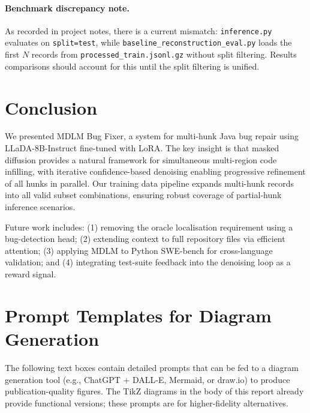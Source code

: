 \documentclass[11pt,a4paper]{article}
\begin{document}
\paragraph{Benchmark discrepancy note.}
As recorded in project notes, there is a current mismatch: \texttt{inference.py} evaluates on \texttt{split=test}, while \texttt{baseline\_reconstruction\_eval.py} loads the first $N$ records from \texttt{processed\_train.jsonl.gz} without split filtering. Results comparisons should account for this until the split filtering is unified.

\section{Conclusion}
\label{sec:conclusion}

We presented MDLM Bug Fixer, a system for multi-hunk Java bug repair using LLaDA-8B-Instruct fine-tuned with LoRA. The key insight is that masked diffusion provides a natural framework for simultaneous multi-region code infilling, with iterative confidence-based denoising enabling progressive refinement of all hunks in parallel. Our training data pipeline expands multi-hunk records into all valid subset combinations, ensuring robust coverage of partial-hunk inference scenarios.

Future work includes: (1) removing the oracle localisation requirement using a bug-detection head; (2) extending context to full repository files via efficient attention; (3) applying MDLM to Python SWE-bench for cross-language validation; and (4) integrating test-suite feedback into the denoising loop as a reward signal.

\appendix
\section{Prompt Templates for Diagram Generation}
\label{sec:prompts}

The following text boxes contain detailed prompts that can be fed to a diagram generation tool (e.g., ChatGPT + DALL-E, Mermaid, or draw.io) to produce publication-quality figures. The TikZ diagrams in the body of this report already provide functional versions; these prompts are for higher-fidelity alternatives.
\end{document}
